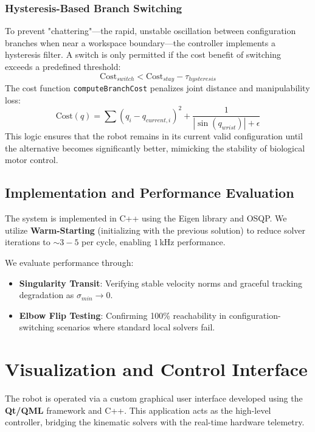 \documentclass[12pt,a4paper]{report}
\begin{document}
\subsubsection{Hysteresis-Based Branch Switching}
To prevent "chattering"---the rapid, unstable oscillation between configuration branches when near a workspace boundary---the controller implements a hysteresis filter. A switch is only permitted if the cost benefit of switching exceeds a predefined threshold:
\begin{equation}
    \text{Cost}_{switch} < \text{Cost}_{stay} - \tau_{hysteresis}
\end{equation}
The cost function \texttt{computeBranchCost} penalizes joint distance and manipulability loss:
\begin{equation}
    \text{Cost}(q) = \sum (q_i - q_{current,i})^2 + \frac{1}{|\sin(q_{wrist})| + \epsilon}
\end{equation}
This logic ensures that the robot remains in its current valid configuration until the alternative becomes significantly better, mimicking the stability of biological motor control.

\subsection{Implementation and Performance Evaluation}
The system is implemented in C++ using the Eigen library and OSQP. We utilize \textbf{Warm-Starting} (initializing with the previous solution) to reduce solver iterations to $\sim 3-5$ per cycle, enabling $1\,$kHz performance.

We evaluate performance through:
\begin{itemize}
    \item \textbf{Singularity Transit}: Verifying stable velocity norms and graceful tracking degradation as $\sigma_{min} \to 0$.
    \item \textbf{Elbow Flip Testing}: Confirming 100\% reachability in configuration-switching scenarios where standard local solvers fail.
\end{itemize}


\section{Visualization and Control Interface}

The robot is operated via a custom graphical user interface developed using the \textbf{Qt/QML} framework and C++. This application acts as the high-level controller, bridging the kinematic solvers with the real-time hardware telemetry.
\end{document}
